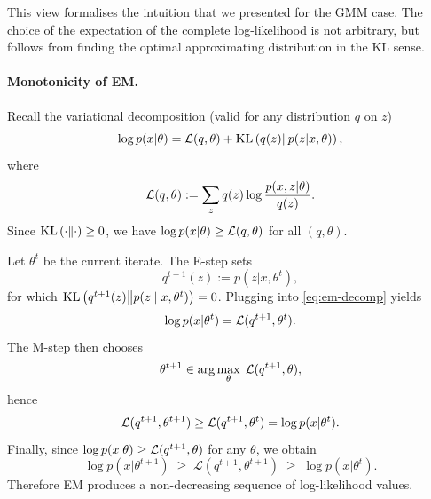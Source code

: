\begin{remark}
     This view formalises the intuition that we presented for the GMM case. The choice of the expectation of the complete log-likelihood is not arbitrary, but follows from finding the optimal approximating distribution in the KL sense.
\end{remark}



\paragraph{Monotonicity of EM.}
Recall the variational decomposition (valid for any distribution $q$ on $z$)
\begin{equation}
\label{eq:em-decomp}
\log p(x | \theta)
= \mathcal L(q,\theta) + \text{KL}\left(q(z)\middle\|p(z | x,\theta)\right),
\end{equation}
where
\begin{equation}
\label{eq:elbo-def}
{\mathcal L}(q,\theta)
:= \sum_z q(z)\log\frac{p(x,z| \theta)}{q(z)}.
\end{equation}
Since $\text{KL}\left(\cdot\middle\|\cdot\right)\ge 0$, we have $\log p(x| \theta)\ge {\mathcal L}(q,\theta)$ for all $(q,\theta)$.

Let $\theta^{t}$ be the current iterate. The E-step sets
\begin{equation}
\label{eq:e-step}
q^{t+1}(z) := p(z| x,\theta^{t}),
\end{equation}
for which $\text{KL}\left(q^{t+1}(z)\middle\|p(z\mid x,\theta^{t})\right)=0$. Plugging into \eqref{eq:em-decomp} yields
\begin{equation}
\label{eq:tight-at-theta-t}
\log p(x| \theta^{t}) = {\mathcal L}(q^{t+1},\theta^{t}).
\end{equation}
The M-step then chooses
\begin{equation}
\label{eq:m-step}
\theta^{t+1} \in \arg\max_{\theta}\; {\mathcal L}(q^{t+1},\theta),
\end{equation}
hence
\begin{equation}
\label{eq:increase-elbo}
\mathcal L(q^{t+1},\theta^{t+1}) \ge {\mathcal L}(q^{t+1},\theta^{t})
= \log p(x| \theta^{t}).
\end{equation}
Finally, since $\log p(x| \theta)\ge {\mathcal L}(q^{t+1},\theta)$ for any $\theta$, we obtain
\begin{equation}
\label{eq:em-monotone}
\log p(x| \theta^{t+1})
\;\ge\; \mathcal L(q^{t+1},\theta^{t+1})
\;\ge\; \log p(x| \theta^{t}).
\end{equation}
Therefore EM produces a non-decreasing sequence of log-likelihood values.

